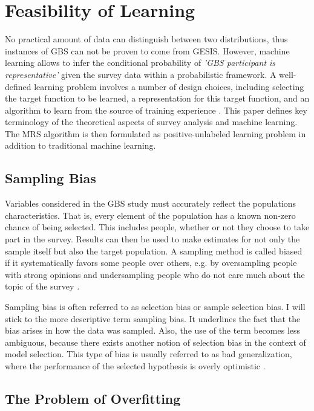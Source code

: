 \chapter{Feasibility of Learning}\label{Sec:Feasibility of Learning}

No practical amount of data can distinguish between two distributions, thus instances of GBS can not be proven to come from GESIS. However, machine learning allows to infer the conditional probability of \textit{'GBS participant is representative'} given the survey data within a probabilistic framework. A well-defined learning problem involves a number of design choices, including selecting the target function to be learned, a representation for this target function, and an algorithm to learn from the source of training experience \cite{tom}. This paper defines key terminology of the theoretical aspects of survey analysis and machine learning. The MRS algorithm is then formulated as positive-unlabeled learning problem in addition to traditional machine learning.

\section{Sampling Bias}

Variables considered in the GBS study must accurately reflect the populations characteristics. That is, every element of the population has a known non-zero chance of being selected. This includes people, whether or not they choose to take part in the survey. Results can then be used to make estimates for not only the sample itself but also the target population. A sampling method is called biased if it systematically favors some people over others, e.g. by oversampling people with strong opinions and undersampling people who do not care much about the topic of the survey \cite{west}.

Sampling bias is often referred to as selection bias or sample selection bias. I will stick to the more descriptive term sampling bias. It underlines the fact that the bias arises in how the data was sampled. Also, the use of the term becomes less ambiguous, because there exists another notion of selection bias in the context of model selection. This type of bias is usually referred to as bad generalization, where the performance of the selected hypothesis is overly optimistic \cite{yaser}.

\section{The Problem of Overfitting}


